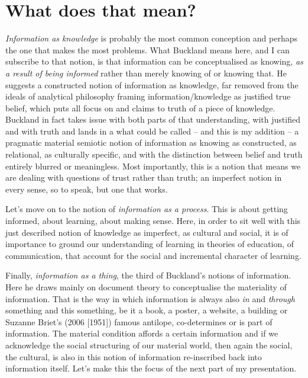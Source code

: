 \documentclass[a4paper,
fontsize=11pt,
oneside,
numbers=noperiodatend,
parskip=half-,
bibliography=totoc,
final
]{scrartcl}
\begin{document}
\section*{What does that mean?}\label{what-does-that-mean}

\emph{Information as knowledge} is probably the most common conception
and perhaps the one that makes the most problems. What Buckland means
here, and I can subscribe to that notion, is that information can be
conceptualised as knowing, \emph{as a result of being informed} rather
than merely knowing of or knowing that. He suggests a constructed notion
of information as knowledge, far removed from the ideals of analytical
philosophy framing information/knowledge as justified true belief, which
puts all focus on and claims to truth of a piece of knowledge. Buckland
in fact takes issue with both parts of that understanding, with
justified and with truth and lands in a what could be called -- and this
is my addition -- a pragmatic material semiotic notion of information as
knowing as constructed, as relational, as culturally specific, and with
the distinction between belief and truth entirely blurred or
meaningless. Most importantly, this is a notion that means we are
dealing with questions of trust rather than truth; an imperfect notion
in every sense, so to speak, but one that works.

Let's move on to the notion of \emph{information as a process}. This is
about getting informed, about learning, about making sense. Here, in
order to sit well with this just described notion of knowledge as
imperfect, as cultural and social, it is of importance to ground our
understanding of learning in theories of education, of communication,
that account for the social and incremental character of learning.

Finally, \emph{information as a thing}, the third of Buckland's notions
of information. Here he draws mainly on document theory to conceptualise
the materiality of information. That is the way in which information is
always also \emph{in} and \emph{through} something and this something,
be it a book, a poster, a website, a building or Suzanne Briet's (2006
{[}1951{]}) famous antilope, co-determines or is part of information.
The material condition affords a certain information and if we
acknowledge the social structuring of our material world, then again the
social, the cultural, is also in this notion of information re-inscribed
back into information itself. Let's make this the focus of the next part
of my presentation.
\end{document}
